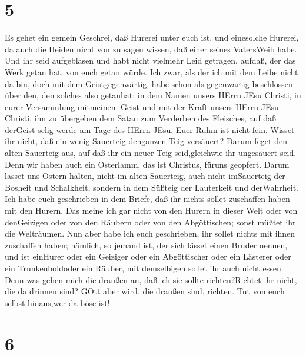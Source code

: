 \hypertarget{section-4}{%
\section{5}\label{section-4}}

 Es gehet ein gemein Geschrei, daß Hurerei unter euch ist,
und einesolche Hurerei, da auch die Heiden nicht von zu sagen wissen,
daß einer seines VatersWeib habe.  Und ihr seid aufgeblasen
und habt nicht vielmehr Leid getragen, aufdaß, der das Werk getan hat,
von euch getan würde.  Ich zwar, als der ich mit dem Leibe
nicht da bin, doch mit dem Geistgegenwärtig, habe schon als gegenwärtig
beschlossen über den, den solches also getanhat:  in dem
Namen unsers HErrn JEsu Christi, in eurer Versammlung mitmeinem Geist
und mit der Kraft unsers HErrn JEsu Christi.  ihn zu
übergeben dem Satan zum Verderben des Fleisches, auf daß derGeist selig
werde am Tage des HErrn JEsu.  Euer Ruhm ist nicht fein.
Wisset ihr nicht, daß ein wenig Sauerteig denganzen Teig versäuert?
 Darum feget den alten Sauerteig aus, auf daß ihr ein neuer
Teig seid,gleichwie ihr ungesäuert seid. Denn wir haben auch ein
Osterlamm, das ist Christus, füruns geopfert.  Darum lasset
uns Ostern halten, nicht im alten Sauerteig, auch nicht imSauerteig der
Bosheit und Schalkheit, sondern in dem Süßteig der Lauterkeit und
derWahrheit.  Ich habe euch geschrieben in dem Briefe, daß
ihr nichts sollet zuschaffen haben mit den Hurern.  Das
meine ich gar nicht von den Hurern in dieser Welt oder von denGeizigen
oder von den Räubern oder von den Abgöttischen; sonst müßtet ihr die
Welträumen.  Nun aber habe ich euch geschrieben, ihr sollet
nichts mit ihnen zuschaffen haben; nämlich, so jemand ist, der sich
lässet einen Bruder nennen, und ist einHurer oder ein Geiziger oder ein
Abgöttischer oder ein Lästerer oder ein Trunkenboldoder ein Räuber, mit
demselbigen sollet ihr auch nicht essen.  Denn was gehen
mich die draußen an, daß ich sie sollte richten?Richtet ihr nicht, die
da drinnen sind?  GOtt aber wird, die draußen sind,
richten. Tut von euch selbst hinaus,wer da böse ist!

\hypertarget{section-5}{%
\section{6}\label{section-5}}

